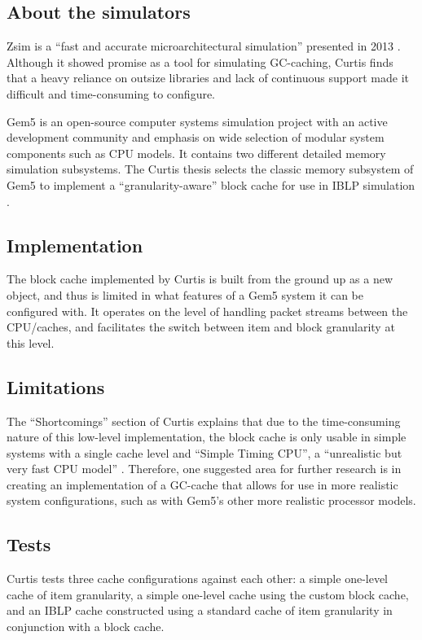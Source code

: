 \documentclass[12pt,twoside]{reedthesis}
\begin{document}
	\subsection*{About the simulators}

	Zsim is a ``fast and accurate microarchitectural simulation'' presented in 2013 \cite{zsim}. Although it showed promise as a tool for simulating GC-caching, Curtis finds that a heavy reliance on outsize libraries and lack of continuous support made it difficult and time-consuming to configure.

	Gem5 is an open-source computer systems simulation project with an active development community and emphasis on wide selection of modular system components such as CPU models. It contains two different detailed memory simulation subsystems. The Curtis thesis selects the classic memory subsystem of Gem5 to implement a ``granularity-aware'' block cache for use in IBLP simulation \cite{curtis}.

	\subsection*{Implementation}

	The block cache implemented by Curtis is built from the ground up as a new object, and thus is limited in what features of a Gem5 system it can be configured with. It operates on the level of handling packet streams between the CPU/caches, and facilitates the switch between item and block granularity at this level.

	\subsection*{Limitations}

	The ``Shortcomings'' section of Curtis explains that due to the time-consuming nature of this low-level implementation, the block cache is only usable in simple systems with a single cache level and ``Simple Timing CPU'', a ``unrealistic but very fast CPU model'' \cite{curtis}. Therefore, one suggested area for further research is in creating an implementation of a GC-cache that allows for use in more realistic system configurations, such as with Gem5's other more realistic processor models.

	\subsection*{Tests}

	Curtis tests three cache configurations against each other: a simple one-level cache of item granularity, a simple one-level cache using the custom block cache, and an IBLP cache constructed using a standard cache of item granularity in conjunction with a block cache.
	
\end{document}
